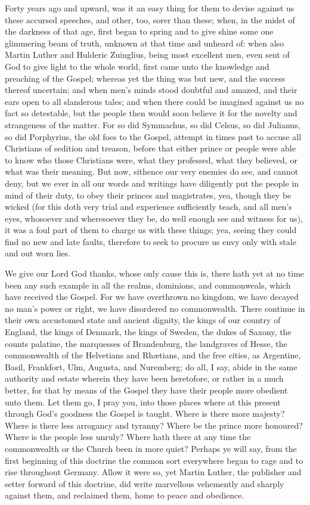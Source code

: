 Forty years ago and upward, was it an easy thing for them to devise
against us these accursed speeches, and other, too, sorer than these;
when, in the midst of the darkness of that age, first began to spring
and to give shine some one glimmering beam of truth, unknown at that
time and unheard of: when also Martin Luther and Hulderic Zuinglius,
being most excellent men, even sent of God to give light to the whole
world, first came unto the knowledge and preaching of the Gospel; whereas
yet the thing was but new, and the success thereof uncertain; and when
men’s minds stood doubtful and amazed, and their ears open to
all slanderous tales; and when there could be imagined against us no
fact so detestable, but the people then would soon believe it for the
novelty and strangeness of the matter. For so did Symmachus, so
did Celsus, so did Julianus, so did Porphyrius, the old foes to the
Gospel, attempt in
times past to accuse all Christians of sedition and treason, before
that either prince or people were able to know who those Christians
were, what they professed, what they believed, or what was their meaning.
But now, sithence our very enemies do see, and cannot deny, but we ever
in all our words and writings have diligently put the people in mind
of their duty, to obey their princes and magistrates, yea, though they
be wicked (for this doth very trial and experience sufficiently teach,
and all men’s eyes, whosoever and wheresoever they be, do well
enough see and witness for us), it was a foul part of them to charge
us with these things; yea, seeing they could find no new and late faults,
therefore to seek to procure us envy only with stale and out worn lies.

We give our Lord God thanks, whose only cause this is, there hath
yet at no time been any such example in all the realms, dominions, and
commonweals, which have received the Gospel. For we have overthrown
no kingdom, we have decayed no man’s power or right, we have disordered
no commonwealth. There continue in their own accustomed state
and ancient dignity, the kings of our country of England, the kings
of Denmark, the kings of Sweden, the dukes of Saxony, the counts palatine,
the marquesses of Brandenburg, the landgraves of
Hesse, the commonwealth of the Helvetians and Rhætians, and the
free cities, as Argentine, Basil, Frankfort, Ulm, Augusta, and Nuremberg;
do all, I say, abide in the same authority and estate wherein they have
been heretofore, or rather in a much better, for that by means of the
Gospel they have their people more obedient unto them. Let them
go, I pray you, into those places where at this present through God’s
goodness the Gospel is taught. Where is there more majesty?
Where is there less arrogancy and tyranny? Where be the prince
more honoured? Where is the people less unruly? Where hath
there at any time the commonwealth or the Church been in more quiet?
Perhaps ye will say, from the first beginning of this doctrine the common
sort everywhere began to rage and to rise throughout Germany.
Allow it were so, yet Martin Luther, the publisher and setter forward
of this doctrine, did write marvellous vehemently and sharply against
them, and reclaimed them, home to peace and obedience.

